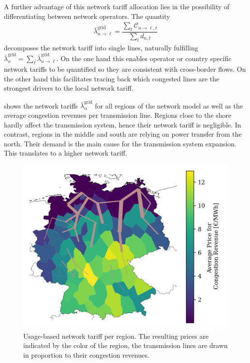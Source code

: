 \documentclass[11pt,twocolumn]{article}
\newcommand{\averagelmp}[1][n]{\bar{\lambda}_{#1}}
\newcommand{\demand}[1][n]{d_{#1,t}}
\newcommand{\cost}{\mathcal{C}}
\newcommand{\allocatelinecost}[1][n \rightarrow \ell]{\cost_{#1, t}}
\begin{document}
A further advantage of this network tariff allocation lies in the possibility of differentiating between network operators. The quantity 
\begin{align}
    \averagelmp[n\rightarrow \ell]^\text{grid} = \dfrac{\sum_{t} \allocatelinecost}{\sum_t \demand}
\end{align}
decomposes the network tariff into single lines, naturally fulfilling  $\averagelmp^\text{grid} = \sum_\ell \averagelmp[n\rightarrow \ell]^\text{grid}$. On the one hand this enables operator or country specific network tariffs to be quantified so they are consistent with cross-border flows. On the other hand this facilitates tracing back which congested lines are the strongest drivers to the local network tariff.    

 shows the network tariffs $\averagelmp[n]^\text{grid}$ for all regions of the network model as well as the average congestion revenues per transmission line. Regions close to the shore hardly affect the transmission system, hence their network tariff is negligible. In contrast, regions in the middle and south are relying on power transfer from the north. Their demand is the main cause for the transmission system expansion. This translates to a higher network tariff. 

\begin{figure}
    \includegraphics[width=\linewidth]{de50/maps_price/branch_investment_cost.png}
    \caption{Usage-based network tariff per region. The resulting prices are indicated by the color of the region, the transmission lines are drawn in proportion to their congestion revenues.}
    \label{fig:congestion_revenue}    
\end{figure}
\end{document}
